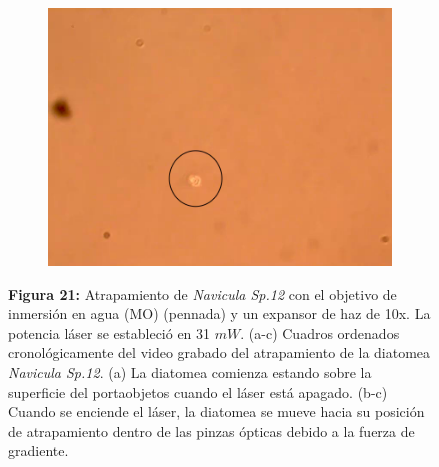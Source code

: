 \documentclass[10pt,aspectratio=1610,compress,dvipsnames]{beamer}
\begin{document}
\begin{frame}
{\begin{figure}[H]
\begin{subfigure}[b]{0.3\textwidth}
         \centering
         \includegraphics[width=\textwidth]{Results/Resultsforthalgae/falgae3.png}
         \caption{}
         \label{fig:five over x}
     \end{subfigure}
        \captionsetup{labelformat = empty}
     \caption{\textbf{Figura 21:} Atrapamiento de \textit{Navicula Sp.12} con el objetivo de inmersión en agua (MO) (pennada) y un expansor de haz de 10x. La potencia láser se estableció en 31 $mW$. (a-c) Cuadros ordenados cronológicamente del video grabado del atrapamiento de la diatomea \textit{Navicula Sp.12}. (a) La diatomea comienza estando sobre la superficie del portaobjetos cuando el láser está apagado. (b-c) Cuando se enciende el láser, la diatomea se mueve hacia su posición de atrapamiento dentro de las pinzas ópticas debido a la fuerza de gradiente.}
\label{WITHIRD1}
     
\end{figure}




}




\end{frame}
\end{document}
